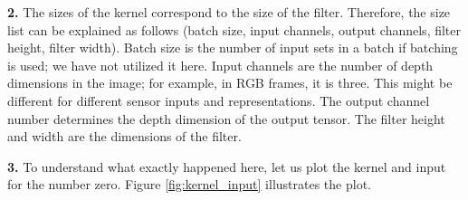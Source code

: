 \documentclass{assignment}
\begin{document}
\textbf{2.}
\noindent The sizes of the kernel correspond to the size of the filter. Therefore, the size list can be explained as follows (batch size, input channels, output channels, filter height, filter width). Batch size is the number of input sets in a batch if batching is used; we have not utilized it here. Input channels are the number of depth dimensions in the image; for example, in RGB frames, it is three. This might be different for different sensor inputs and representations. The output channel number determines the depth dimension of the output tensor. The filter height and width are the dimensions of the filter.

\textbf{3.}
To understand what exactly happened here, let us plot the kernel and input for the number zero. Figure \ref{fig:kernel_input} illustrates the plot.
\end{document}
